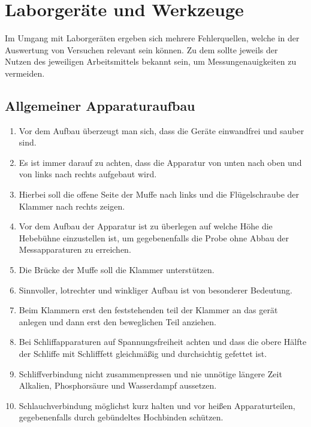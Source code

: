\section{Laborgeräte und Werkzeuge}
Im Umgang mit Laborgeräten ergeben sich mehrere Fehlerquellen, welche in der Auswertung von Versuchen relevant sein können. Zu dem sollte jeweils der Nutzen des jeweiligen Arbeitsmittels bekannt sein, um Messungenauigkeiten zu vermeiden.



\subsection*{Allgemeiner Apparaturaufbau}
\begin{enumerate}
	\item Vor dem Aufbau überzeugt man sich, dass die Geräte einwandfrei und sauber sind.
	\item Es ist immer darauf zu achten, dass die Apparatur von unten nach oben und von links nach rechts aufgebaut wird.
	\item Hierbei soll die offene Seite der Muffe nach links und die Flügelschraube der Klammer nach rechts zeigen.
	\item Vor dem Aufbau der Apparatur ist zu überlegen auf welche Höhe die Hebebühne einzustellen ist, um gegebenenfalls die Probe ohne Abbau der Messapparaturen zu erreichen.
	\item Die Brücke der Muffe soll die Klammer unterstützen.
	\item Sinnvoller, lotrechter und winkliger Aufbau ist von besonderer Bedeutung.
	\item Beim Klammern erst den feststehenden teil der Klammer an das gerät anlegen und dann erst den beweglichen Teil anziehen.
	\item Bei Schliffapparaturen auf Spannungsfreiheit achten und dass die obere Hälfte der Schliffe mit Schlifffett gleichmäßig und durchsichtig gefettet ist.
	\item Schliffverbindung nicht zusammenpressen und nie unnötige längere Zeit Alkalien, Phosphorsäure und Wasserdampf aussetzen.
	\item Schlauchverbindung möglichst kurz halten und vor heißen Apparaturteilen, gegebenenfalls durch gebündeltes Hochbinden schützen.
\end{enumerate}
